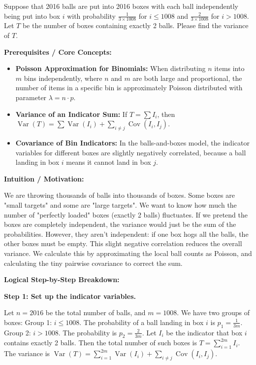 \begin{exercise}\label{probability:2016:3}
Suppose that 2016 balls are put into 2016 boxes with each ball independently being put into box $i$ with probability $\frac{1}{3 \times 1008}$ for $i \leq 1008$ and $\frac{2}{3 \times 1008}$ for $i > 1008$. Let $T$ be the number of boxes containing exactly 2 balls. Please find the variance of $T$.
\end{exercise}
\begin{solution}
\textbf{Prerequisites / Core Concepts:}
\begin{itemize}
    \item \textbf{Poisson Approximation for Binomials:} When distributing $n$ items into $m$ bins independently, where $n$ and $m$ are both large and proportional, the number of items in a specific bin is approximately Poisson distributed with parameter $\lambda = n \cdot p$.
    \item \textbf{Variance of an Indicator Sum:} If $T = \sum I_i$, then $\operatorname{Var}(T) = \sum \operatorname{Var}(I_i) + \sum_{i \neq j} \operatorname{Cov}(I_i, I_j)$.
    \item \textbf{Covariance of Bin Indicators:} In the balls-and-boxes model, the indicator variables for different boxes are slightly negatively correlated, because a ball landing in box $i$ means it cannot land in box $j$.
\end{itemize}

\textbf{Intuition / Motivation:}

We are throwing thousands of balls into thousands of boxes. Some boxes are "small targets" and some are "large targets". We want to know how much the number of "perfectly loaded" boxes (exactly 2 balls) fluctuates. If we pretend the boxes are completely independent, the variance would just be the sum of the probabilities. However, they aren't independent: if one box hogs all the balls, the other boxes must be empty. This slight negative correlation reduces the overall variance. We calculate this by approximating the local ball counts as Poisson, and calculating the tiny pairwise covariance to correct the sum.

\textbf{Logical Step-by-Step Breakdown:}

\textbf{Step 1: Set up the indicator variables.}

Let $n = 2016$ be the total number of balls, and $m = 1008$.
We have two groups of boxes:
Group 1: $i \leq 1008$. The probability of a ball landing in box $i$ is $p_1 = \frac{1}{3m}$.
Group 2: $i > 1008$. The probability is $p_2 = \frac{2}{3m}$.
Let $I_i$ be the indicator that box $i$ contains exactly 2 balls. Then the total number of such boxes is $T = \sum_{i=1}^{2m} I_i$.
The variance is $\operatorname{Var}(T) = \sum_{i=1}^{2m} \operatorname{Var}(I_i) + \sum_{i \neq j} \operatorname{Cov}(I_i, I_j)$.


\end{solution}
